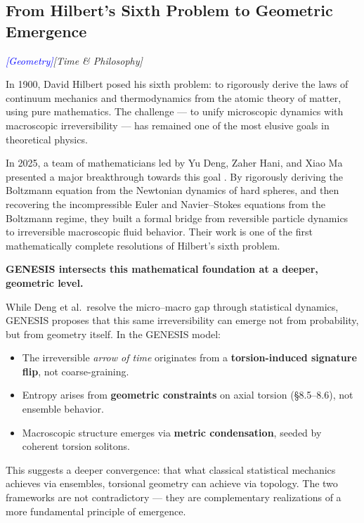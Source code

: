 \documentclass{article}
\newcommand{\geometrytag}{\textcolor{blue}{\textit{[Geometry]}}}
\newcommand{\timetag}{\textcolor{orange!80!black}{\textit{[Time \& Philosophy]}}}
\begin{document}
\subsection{ From Hilbert’s Sixth Problem to Geometric Emergence}
\geometrytag  \timetag

In 1900, David Hilbert posed his sixth problem: to rigorously derive the laws of continuum mechanics and thermodynamics from the atomic theory of matter, using pure mathematics. The challenge — to unify microscopic dynamics with macroscopic irreversibility — has remained one of the most elusive goals in theoretical physics.

In 2025, a team of mathematicians led by Yu Deng, Zaher Hani, and Xiao Ma presented a major breakthrough towards this goal \cite{Deng2025thesis}. By rigorously deriving the Boltzmann equation from the Newtonian dynamics of hard spheres, and then recovering the incompressible Euler and Navier–Stokes equations from the Boltzmann regime, they built a formal bridge from reversible particle dynamics to irreversible macroscopic fluid behavior. Their work is one of the first mathematically complete resolutions of Hilbert’s sixth problem.

\vspace{0.5em}

\noindent \textbf{GENESIS intersects this mathematical foundation at a deeper, geometric level.}

While Deng et al.\ resolve the micro--macro gap through statistical dynamics, GENESIS proposes that this same irreversibility can emerge not from probability, but from geometry itself. In the GENESIS model:
\begin{itemize}
  \item The irreversible \emph{arrow of time} originates from a \textbf{torsion-induced signature flip}, not coarse-graining.
  \item Entropy arises from \textbf{geometric constraints} on axial torsion (\S8.5--8.6), not ensemble behavior.
  \item Macroscopic structure emerges via \textbf{metric condensation}, seeded by coherent torsion solitons.
\end{itemize}

This suggests a deeper convergence: that what classical statistical mechanics achieves via ensembles, torsional geometry can achieve via topology. The two frameworks are not contradictory — they are complementary realizations of a more fundamental principle of emergence.
\end{document}
